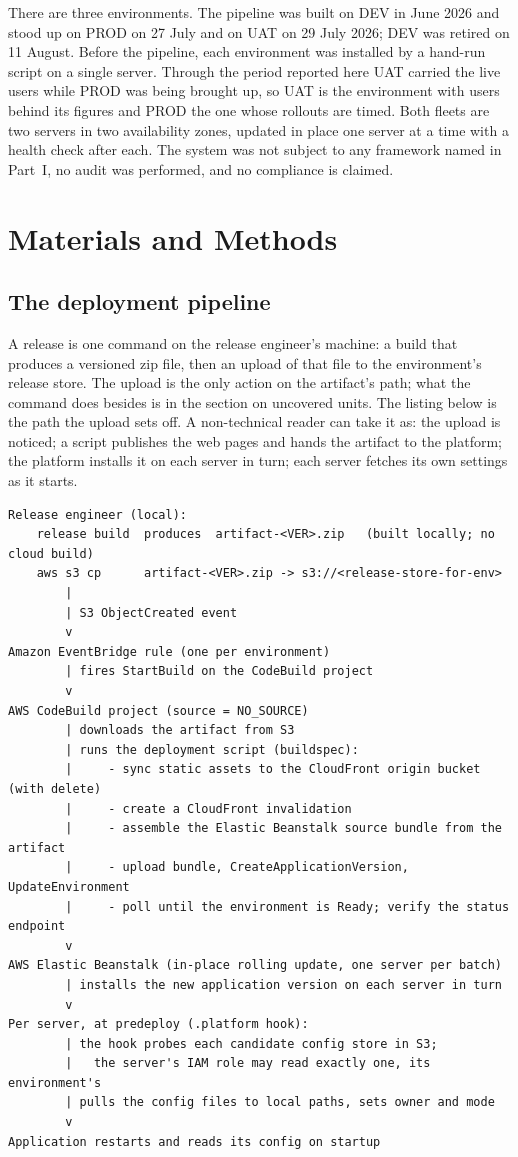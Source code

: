 \documentclass[11pt]{article}
\begin{document}
There are three environments. The pipeline was built on DEV in June 2026 and stood up on PROD on 27 July and on UAT on 29 July 2026; DEV was retired on 11 August. Before the pipeline, each environment was installed by a hand-run script on a single server. Through the period reported here UAT carried the live users while PROD was being brought up, so UAT is the environment with users behind its figures and PROD the one whose rollouts are timed. Both fleets are two servers in two availability zones, updated in place one server at a time with a health check after each. The system was not subject to any framework named in Part~I, no audit was performed, and no compliance is claimed.

\section{Materials and Methods}

\subsection{The deployment pipeline}

A release is one command on the release engineer's machine: a build that produces a versioned zip file, then an upload of that file to the environment's release store. The upload is the only action on the artifact's path; what the command does besides is in the section on uncovered units. The listing below is the path the upload sets off. A non-technical reader can take it as: the upload is noticed; a script publishes the web pages and hands the artifact to the platform; the platform installs it on each server in turn; each server fetches its own settings as it starts.

\begin{lstlisting}
Release engineer (local):
    release build  produces  artifact-<VER>.zip   (built locally; no cloud build)
    aws s3 cp      artifact-<VER>.zip -> s3://<release-store-for-env>
        |
        | S3 ObjectCreated event
        v
Amazon EventBridge rule (one per environment)
        | fires StartBuild on the CodeBuild project
        v
AWS CodeBuild project (source = NO_SOURCE)
        | downloads the artifact from S3
        | runs the deployment script (buildspec):
        |     - sync static assets to the CloudFront origin bucket (with delete)
        |     - create a CloudFront invalidation
        |     - assemble the Elastic Beanstalk source bundle from the artifact
        |     - upload bundle, CreateApplicationVersion, UpdateEnvironment
        |     - poll until the environment is Ready; verify the status endpoint
        v
AWS Elastic Beanstalk (in-place rolling update, one server per batch)
        | installs the new application version on each server in turn
        v
Per server, at predeploy (.platform hook):
        | the hook probes each candidate config store in S3;
        |   the server's IAM role may read exactly one, its environment's
        | pulls the config files to local paths, sets owner and mode
        v
Application restarts and reads its config on startup
\end{lstlisting}
\end{document}

